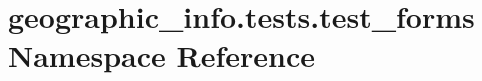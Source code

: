 \hypertarget{namespacegeographic__info_1_1tests_1_1test__forms}{\section{geographic\-\_\-info.\-tests.\-test\-\_\-forms Namespace Reference}
\label{namespacegeographic__info_1_1tests_1_1test__forms}
}
